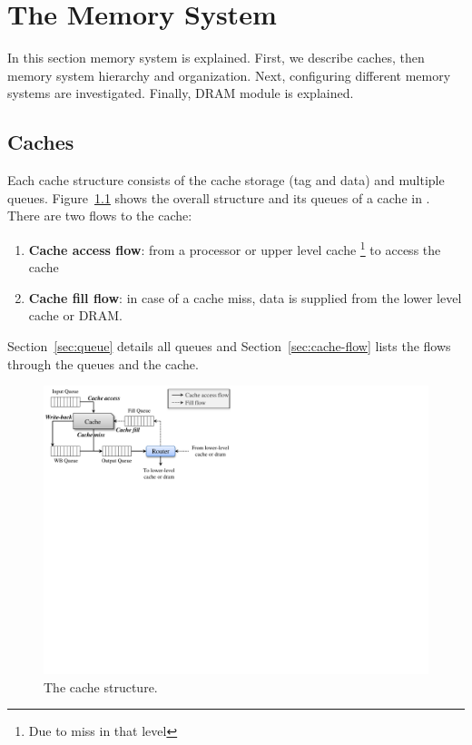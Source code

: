 \chapter{The Memory System}
\label{sec:memory}
In this section \SIM memory system is explained. First, we describe caches,
then memory system hierarchy and organization. Next, configuring different
memory systems are investigated. Finally, DRAM module is explained.

\section{Caches}

Each cache structure consists of the cache storage (tag and data) and multiple
queues. Figure~\ref{fig:cache} shows the overall structure and its queues
of a cache in \SIM. There are two flows to the cache:
\begin{enumerate}
 \item \textbf{Cache access flow}: from a processor or upper level cache
		\footnote{Due to miss in that level} to access the cache
 \item \textbf{Cache fill flow}: in case of a cache miss, data is supplied from the 
		lower level cache or DRAM.
\end{enumerate}
Section~\ref{sec:queue} details all queues and Section~\ref{sec:cache-flow}
lists the flows through the queues and the cache.

\begin{figure}[htb]
  \centering
  \includegraphics{figs/cache}
  \caption{The cache structure.}
  \label{fig:cache}
\end{figure}

